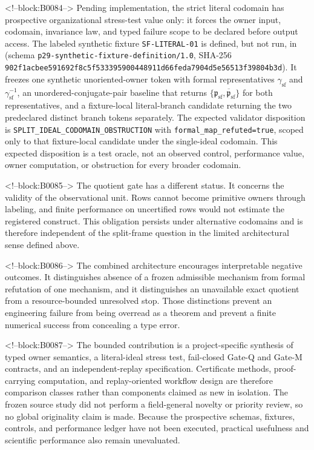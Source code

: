 \documentclass[11pt,a4paper]{article}
\begin{document}
<!--block:B0084-->
Pending implementation, the strict literal codomain has prospective organizational stress-test value only: it forces the owner input, codomain, invariance law, and typed failure scope to be declared before output access. The labeled synthetic fixture \texttt{SF-LITERAL-01} is defined, but not run, in  (schema \texttt{p29-synthetic-fixture-definition/1.0}, SHA-256 \texttt{902f1acb\allowbreak{}ee591692\allowbreak{}f8c5f533\allowbreak{}39590044\allowbreak{}8911d66f\allowbreak{}eda7904d\allowbreak{}5e56513f\allowbreak{}39804b3d}). It freezes one synthetic unoriented-owner token with formal representatives \(\gamma_{\mathrm{sf}}\) and \(\gamma_{\mathrm{sf}}^{-1}\), an unordered-conjugate-pair baseline that returns \(\{\mathfrak p_{\mathrm{sf}},\overline{\mathfrak p}_{\mathrm{sf}}\}\) for both representatives, and a fixture-local literal-branch candidate returning the two predeclared distinct branch tokens separately. The expected validator disposition is \texttt{SPLIT\_IDEAL\_CODOMAIN\_OBSTRUCTION} with \texttt{formal\_map\_refuted=true}, scoped only to that fixture-local candidate under the single-ideal codomain. This expected disposition is a test oracle, not an observed control, performance value, owner computation, or obstruction for every broader codomain.

<!--block:B0085-->
The quotient gate has a different status. It concerns the validity of the observational unit. Rows cannot become primitive owners through labeling, and finite performance on uncertified rows would not estimate the registered construct. This obligation persists under alternative codomains and is therefore independent of the split-frame question in the limited architectural sense defined above.

<!--block:B0086-->
The combined architecture encourages interpretable negative outcomes. It distinguishes absence of a frozen admissible mechanism from formal refutation of one mechanism, and it distinguishes an unavailable exact quotient from a resource-bounded unresolved stop. Those distinctions prevent an engineering failure from being overread as a theorem and prevent a finite numerical success from concealing a type error.

<!--block:B0087-->
The bounded contribution is a project-specific synthesis of typed owner semantics, a literal-ideal stress test, fail-closed Gate-Q and Gate-M contracts, and an independent-replay specification. Certificate methods, proof-carrying computation, and replay-oriented workflow design are therefore comparison classes rather than components claimed as new in isolation. The frozen source study did not perform a field-general novelty or priority review, so no global originality claim is made. Because the prospective schemas, fixtures, controls, and performance ledger have not been executed, practical usefulness and scientific performance also remain unevaluated.
\end{document}
